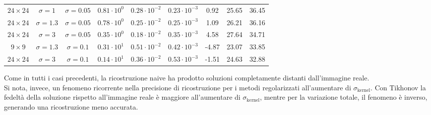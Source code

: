 \documentclass[11pt]{article}
\begin{document}
\begin{center}
\begin{tabular}{ |cc|c|c|c|c|c|c|c| }
    $24 \times 24$ & $\sigma=1$ & $\sigma=0.05$ & $0.81 \cdot 10^{0}$ & $0.28 \cdot 10^{-2}$ & $0.23 \cdot 10^{-3}$ & 0.92 & 25.65 & 36.45 \\
    $24 \times 24$ & $\sigma=1.3$ & $\sigma=0.05$ & $0.78 \cdot 10^{0}$ & $0.25 \cdot 10^{-2}$ & $0.25 \cdot 10^{-3}$ & 1.09 & 26.21 & 36.16 \\
    $24 \times 24$ & $\sigma=3$ & $\sigma=0.05$ & $0.35 \cdot 10^{0}$ & $0.18 \cdot 10^{-2}$ & $0.35 \cdot 10^{-3}$ & 4.58 & 27.64 & 34.71 \\
    \hline
	$9 \times 9$ & $\sigma=1.3$ & $\sigma=0.1$ & $0.31 \cdot 10^{1}$ & $0.51 \cdot 10^{-2}$ & $0.42 \cdot 10^{-3}$ & -4.87 & 23.07 & 33.85 \\
	$24 \times 24$ & $\sigma=3$ & $\sigma=0.1$ & $0.14 \cdot 10^{1}$ & $0.36 \cdot 10^{-2}$ & $0.53 \cdot 10^{-3}$ & -1.51 & 24.63 & 32.88 \\
    \hline
    \end{tabular}
\end{center}
Come in tutti i casi precedenti, la ricostruzione naive ha prodotto soluzioni completamente distanti dall'immagine reale.\\
Si nota, invece, un fenomeno ricorrente nella precisione di ricostruzione per i metodi regolarizzati all'aumentare di $\sigma_{\text{kernel}}$. 
Con Tikhonov la fedeltà della soluzione rispetto all'immagine reale è maggiore all'aumentare di $\sigma_{\text{kernel}}$, mentre per la variazione totale, il fenomeno è inverso, generando una ricostruzione meno accurata.
\end{document}
